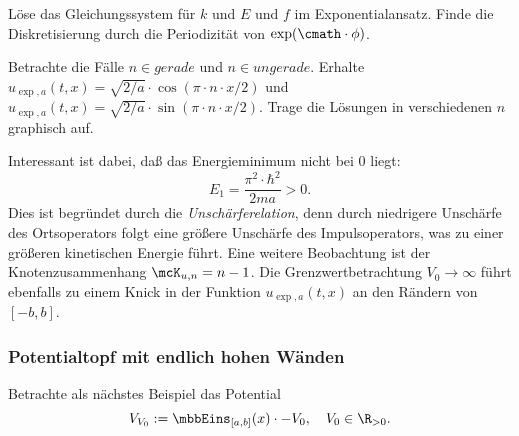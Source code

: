 \documentclass{subfiles}
\begin{document}
        \begin{Aufgabe}
            \nr{} Löse das Gleichungssystem für $k$ und $E$ und $f$ im Exponentialansatz. Finde die Diskretisierung durch die Periodizität von $\exp(\cmath\cdot\phi)$. 

            \nr{} Betrachte die Fälle $n\in\textit{gerade}$ und $n\in\textit{ungerade}$. Erhalte $u_{\exp,a}(t,x) = \sqrt{2/a}\cdot\cos(\pi\cdot n\cdot x/2)$ und $u_{\exp,a}(t,x) = \sqrt{2/a}\cdot\sin(\pi\cdot n\cdot x/2)$. Trage die Lösungen in verschiedenen $n$ graphisch auf. 
        \end{Aufgabe}
        Interessant ist dabei, daß das Energieminimum nicht bei $0$ liegt:
        \[E_1 = \frac{\pi^2\cdot\hbar^2}{2ma} > 0.\]
        Dies ist begründet durch die \emph{Unschärferelation}, denn durch niedrigere Unschärfe des Ortsoperators folgt eine größere Unschärfe des Impulsoperators, was zu einer größeren kinetischen Energie führt. Eine weitere Beobachtung ist der Knotenzusammenhang $\mcK_{u,n} = n-1$. Die Grenzwertbetrachtung $V_0\to\infty$ führt ebenfalls zu einem Knick in der Funktion $u_{\exp,a}(t,x)$ an den Rändern von $[-b,b]$. 

        \subsubsection*{Potentialtopf mit endlich hohen Wänden}
            Betrachte als nächstes Beispiel das Potential 
            \[V_{V_0}:=\mbbEins_{[a,b]}(x)\cdot - V_0,\quad V_0\in\R_{>0}.\]
\end{document}
